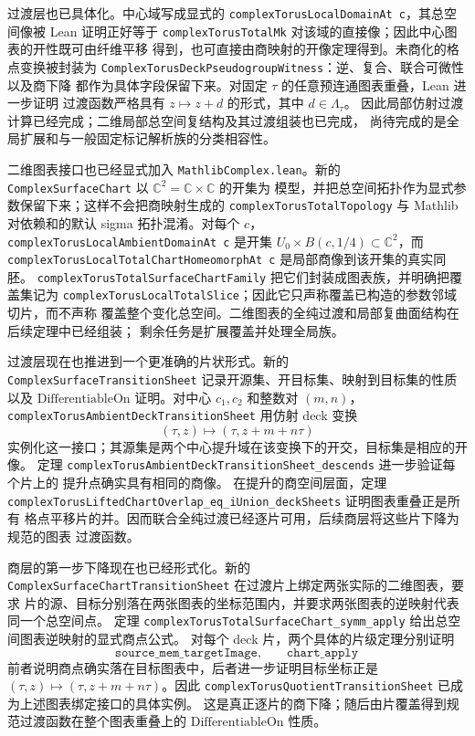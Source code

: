 \documentclass[UTF8,fontset=none,a4paper,11pt]{ctexart}
\begin{document}
过渡层也已具体化。中心域写成显式的
\texttt{complexTorusLocalDomainAt c}，其总空间像被 Lean 证明正好等于
\texttt{complexTorusTotalMk} 对该域的直接像；因此中心图表的开性既可由纤维平移
得到，也可直接由商映射的开像定理得到。未商化的格点变换被封装为
\texttt{ComplexTorusDeckPseudogroupWitness}：逆、复合、联合可微性以及商下降
都作为具体字段保留下来。对固定 \(\tau\) 的任意预连通图表重叠，Lean 进一步证明
过渡函数严格具有 \(z\mapsto z+d\) 的形式，其中 \(d\in\Lambda_\tau\)。
因此局部仿射过渡计算已经完成；二维局部总空间复结构及其过渡组装也已完成，
尚待完成的是全局扩展和与一般固定标记解析族的分类相容性。

二维图表接口也已经显式加入 \texttt{MathlibComplex.lean}。新的
\texttt{ComplexSurfaceChart} 以 \(\mathbb C^2=\mathbb C\times\mathbb C\) 的开集为
模型，并把总空间拓扑作为显式参数保留下来；这样不会把商映射生成的
\texttt{complexTorusTotalTopology} 与 Mathlib 对依赖和的默认 sigma 拓扑混淆。对每个
\(c\)，\texttt{complexTorusLocalAmbientDomainAt c} 是开集
\(U_0\times B(c,1/4)\subset\mathbb C^2\)，而
\texttt{complexTorusLocalTotalChartHomeomorphAt c} 是局部商像到该开集的真实同胚。
\texttt{complexTorusTotalSurfaceChartFamily} 把它们封装成图表族，并明确把覆盖集记为
\texttt{complexTorusLocalTotalSlice}；因此它只声称覆盖已构造的参数邻域切片，而不声称
覆盖整个变化总空间。二维图表的全纯过渡和局部复曲面结构在后续定理中已经组装；
剩余任务是扩展覆盖并处理全局族。

过渡层现在也推进到一个更准确的片状形式。新的
\texttt{ComplexSurfaceTransitionSheet} 记录开源集、开目标集、映射到目标集的性质
以及 \(\mathrm{DifferentiableOn}\) 证明。对中心 \(c_1,c_2\) 和整数对 \((m,n)\)，
\texttt{complexTorusAmbientDeckTransitionSheet} 用仿射 deck 变换
\[
  (\tau,z)\longmapsto(\tau,z+m+n\tau)
\]
实例化这一接口；其源集是两个中心提升域在该变换下的开交，目标集是相应的开像。
定理 \texttt{complexTorusAmbientDeckTransitionSheet\_descends} 进一步验证每个片上的
提升点确实具有相同的商像。
在提升的商空间层面，定理
\texttt{complexTorusLiftedChartOverlap\_eq\_iUnion\_}\allowbreak\texttt{deckSheets} 证明图表重叠正是所有
格点平移片的并。因而联合全纯过渡已经逐片可用，后续商层将这些片下降为规范的图表
过渡函数。

商层的第一步下降现在也已经形式化。新的
\texttt{ComplexSurfaceChartTransitionSheet} 在过渡片上绑定两张实际的二维图表，要求
片的源、目标分别落在两张图表的坐标范围内，并要求两张图表的逆映射代表同一个总空间点。
定理 \texttt{complexTorusTotalSurfaceChart\_symm\_apply} 给出总空间图表逆映射的显式商点公式。
对每个 deck 片，两个具体的片级定理分别证明
\[
\texttt{source\_mem\_targetImage},\qquad
\texttt{chart\_apply}
\]
前者说明商点确实落在目标图表中，后者进一步证明目标坐标正是
\((\tau,z)\mapsto(\tau,z+m+n\tau)\)。因此
\texttt{complexTorusQuotientTransitionSheet} 已成为上述图表绑定接口的具体实例。
这是真正逐片的商下降；随后由片覆盖得到规范过渡函数在整个图表重叠上的
\(\mathrm{DifferentiableOn}\) 性质。
\end{document}
